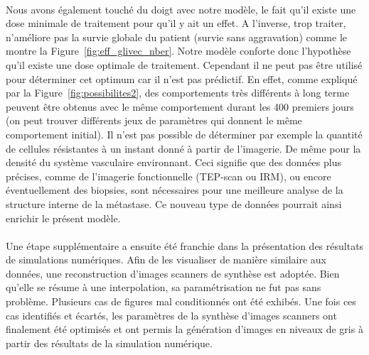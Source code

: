 \documentclass[main.tex]{subfiles}
\begin{document}
\paragraph{}
Nous avons également touché du doigt avec notre modèle, le fait qu'il existe une dose minimale de traitement pour qu'il y ait un effet. A l'inverse, trop traiter, n'améliore pas la survie globale du patient (survie sans aggravation) comme le montre la Figure~\ref{fig:eff_glivec_nber}. 
Notre modèle conforte donc l'hypothèse qu'il existe une dose optimale de traitement. 
Cependant il ne peut pas être utilisé pour déterminer cet optimum car il n'est pas prédictif. 
En effet, comme expliqué par la Figure~\ref{fig:possibilites2}, 
des comportements très différents à long terme peuvent être obtenus avec le même comportement durant les 400 premiers jours (on peut trouver différents jeux de paramètres qui donnent le même comportement initial). 
Il n'est pas possible de déterminer par exemple la quantité de cellules résistantes à un instant donné à partir de l'imagerie. De même pour la densité du système vasculaire environnant. 
Ceci signifie que des données plus précises, comme de l'imagerie fonctionnelle (TEP-scan ou IRM), ou encore éventuellement des biopsies, sont nécessaires pour une meilleure analyse de la structure interne de la métastase. Ce nouveau type de données pourrait ainsi enrichir le présent modèle.


\paragraph{}
Une étape supplémentaire a ensuite été franchie dans la présentation des résultats de simulations numériques. 
Afin de les visualiser de manière similaire aux données, une reconstruction d'images scanners de synthèse est adoptée. Bien qu'elle se résume à une interpolation, sa paramétrisation ne fut pas sans problème.  Plusieurs cas de figures mal conditionnés ont été exhibés. Une fois ces cas identifiés et écartés, les paramètres de la 
synthèse d'images scanners ont finalement été optimisés et ont permis la génération d'images en niveaux de gris à partir des résultats de la simulation numérique.
\end{document}
